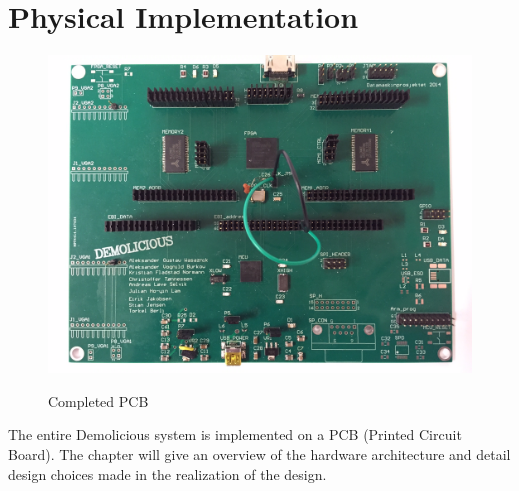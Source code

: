 \documentclass[../main/report.tex]{subfiles}
\begin{document}
\chapter{Physical Implementation}
\label{sec:pcb}

\begin{figure}[H]
    \centering
    \includegraphics[width=\textwidth]{../pcb/assets/pcb-full.jpg}
    \label{fig:pcb-full}
    \caption{Completed PCB}
\end{figure}

The entire Demolicious system is implemented on a PCB (Printed Circuit Board).
The chapter will give an overview of the hardware architecture
and detail design choices made in the realization of the design.














\end{document}
